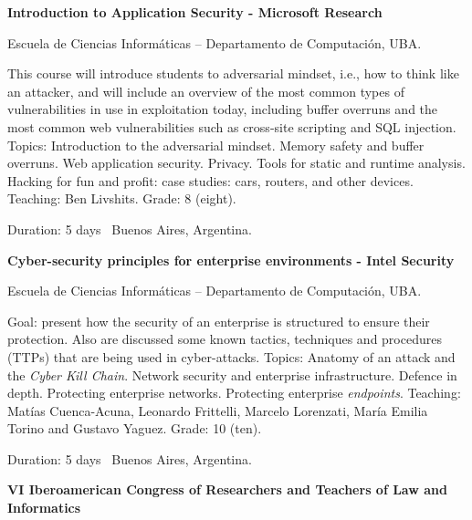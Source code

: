 \documentclass[letterpaper,MMMyyyy,nonstop]{simpleresumecv}
\begin{document}
\begin{body}
\BigGap

\textbf{Introduction to Application Security - Microsoft Research}
\hfill
{}

\BulletItem Escuela de Ciencias Informáticas – Departamento de Computación, UBA.
\begin{detail}
	\SubBulletItem
	This course will introduce students to adversarial mindset, i.e., how to think like an attacker, and will include an overview of the most common types of vulnerabilities in use in exploitation today, including buffer overruns and the most common web vulnerabilities such as cross-site scripting and SQL injection.
	\SubBulletItem
	Topics: Introduction to the adversarial mindset. Memory safety and buffer overruns. Web application security. Privacy. Tools for static and runtime analysis. Hacking for fun and profit: case studies: cars, routers, and other devices.
	\SubBulletItem
	Teaching: Ben Livshits.
	\SubBulletItem
	Grade: 8 (eight).
\end{detail}
Duration: 5 days \SubBulletSymbol\, Buenos Aires, Argentina.

\BigGap

\textbf{Cyber-security principles for enterprise environments - Intel Security}
\hfill
{}

\BulletItem Escuela de Ciencias Informáticas – Departamento de Computación, UBA.
\begin{detail}
	\SubBulletItem
	Goal: present how the security of an enterprise is structured to ensure their protection. Also are discussed some known tactics, techniques and procedures (TTPs) that are being used in cyber-attacks.
	\SubBulletItem
	Topics: Anatomy of an attack and the \textit{Cyber Kill Chain}. Network security and enterprise infrastructure. Defence in depth. Protecting enterprise networks. Protecting enterprise \textit{endpoints}.
	\SubBulletItem
	Teaching: Matías Cuenca-Acuna, Leonardo Frittelli, Marcelo Lorenzati,  María  Emilia  Torino and Gustavo Yaguez.
	\SubBulletItem
	Grade: 10 (ten).
\end{detail}
Duration: 5 days \SubBulletSymbol\, Buenos Aires, Argentina.

\BigGap
\textbf{VI Iberoamerican Congress of Researchers and Teachers of Law and Informatics}
\hfill
{}


\end{body}
\end{document}
